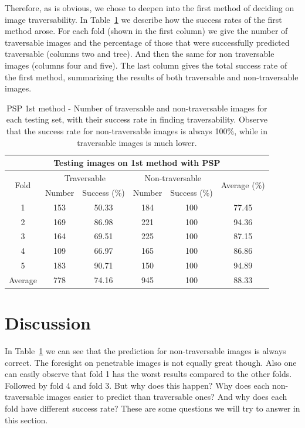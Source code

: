 \documentclass[12pt,a4paper,table,dvipsnames,tikz]{report}
\newcommand{\acronym}{\MakeUppercase}
\newcommand{\bl}[1]{{\hypersetup{linkcolor=blue}#1}}
\begin{document}
	Therefore, as is obvious, we chose to deepen into the first method of deciding on 
	image traversability. In Table~\bl{\ref{table:psp:1st}} we describe how the success 
	rates of the first method arose. For each fold (shown in the first column) we give 
	the number of traversable images and the percentage of those that were successfully 
	predicted traversable (columns two and tree). And then the same for non traversable 
	images (columns four and five). The last column gives the total success rate of the 
	first method, summarizing the results of both traversable and non-traversable images.
	\\
	
	\begin{table}[h!]
		\centering
		\begin{tabular}{|c|c|c|c|c||c|}
			\hline
			\multicolumn{6}{|c|}{Testing images on 1st method with \acronym{psp}}\\
			\hline
			\multirow{2}{*}{Fold} & \multicolumn{2}{c}{Traversable} 
			& \multicolumn{2}{|c||}{Non-traversable} & \multirow{2}{*}{Average (\%)}\\
			& Number & Success (\%) & Number & Success (\%) &\\ 
			\hline\hline
			1 & 153 & 50.33 & 184 & 100 & 77.45\\
			\hline
			2 & 169 & 86.98 & 221 & 100 & 94.36\\
			\hline
			3 & 164 & 69.51 & 225 & 100 & 87.15\\
			\hline
			4 & 109 & 66.97 & 165 & 100 & 86.86\\
			\hline
			5 & 183 & 90.71 & 150 & 100 & 94.89\\
			\hline\hline
			Average & 778 & 74.16 & 945 & 100 & 88.33\\
			\hline
		\end{tabular}
		\caption{\acronym{psp} 1st method - Number of traversable and non-traversable 
			images for each testing set, with their success rate in finding traversability. 
			Observe that the success rate for non-traversable images is always 100\%, 
			while in traversable images is much lower.}
		\label{table:psp:1st}
	\end{table}
	
	\section{Discussion}
	\label{sec:exp:dis}
	
	In Table~\bl{\ref{table:psp:1st}} we can see that the prediction for non-traversable 
	images is always correct. The foresight on penetrable images is not equally great though. 
	Also one can easily observe that fold 1 has the worst results compared to the other 
	folds. Followed by fold 4 and fold 3. But why does this happen? Why does each non-traversable 
	images easier to predict than traversable ones? And why does each fold have different 
	success rate? These are some questions we will try to answer in this section.
	\\
	
\end{document}
